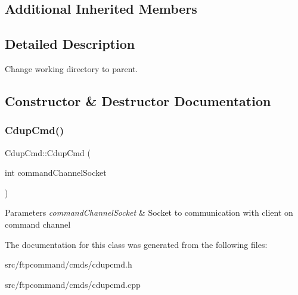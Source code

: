 \subsection*{Additional Inherited Members}


\subsection{Detailed Description}
Change working directory to parent. 

\subsection{Constructor \& Destructor Documentation}
\mbox{\label{classCdupCmd_aeb8d70fa7fd7a90dcf1571a50f829b41}} 
\subsubsection{\texorpdfstring{Cdup\+Cmd()}{CdupCmd()}}
{\footnotesize\ttfamily Cdup\+Cmd\+::\+Cdup\+Cmd (\begin{DoxyParamCaption}\item[{int}]{command\+Channel\+Socket }\end{DoxyParamCaption})}


\begin{DoxyParams}{Parameters}
{\em command\+Channel\+Socket} & Socket to communication with client on command channel \\
\hline
\end{DoxyParams}


The documentation for this class was generated from the following files\+:\begin{DoxyCompactItemize}
\item 
src/ftpcommand/cmds/cdupcmd.\+h\item 
src/ftpcommand/cmds/cdupcmd.\+cpp\end{DoxyCompactItemize}
